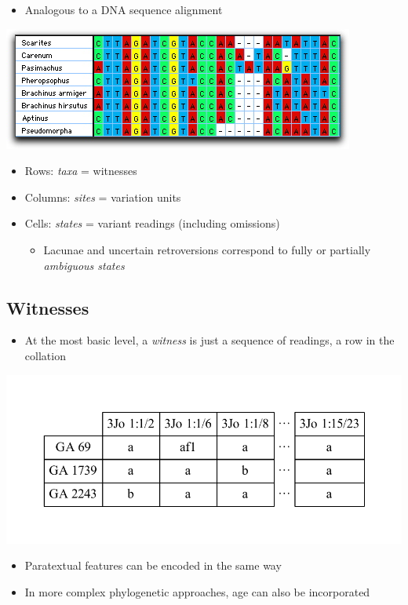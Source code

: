 \documentclass[10pt]{beamer}
\begin{document}
	\begin{frame}
		\begin{itemize}
			\item Analogous to a DNA sequence alignment
		\end{itemize}
		\begin{center}
			\includegraphics[scale=0.5]{../img/sequence-alignment.jpg}
		\end{center}
		\begin{itemize}
			\item Rows: \emph{taxa} = witnesses
			\item Columns: \emph{sites} = variation units
			\item Cells: \emph{states} = variant readings (including omissions)
			\begin{itemize}
				\item Lacunae and uncertain retroversions correspond to fully or partially \emph{ambiguous states}
			\end{itemize}
		\end{itemize}
	\end{frame}
	\subsection{Witnesses}
	\begin{frame}
		\begin{itemize}
			\item At the most basic level, a \emph{witness} is just a sequence of readings, a row in the collation
		\end{itemize}
		\begin{center}
			\includegraphics[scale=0.5]{../img/witnesses.pdf}
		\end{center}
		\begin{itemize}
			\item Paratextual features can be encoded in the same way
			\item In more complex phylogenetic approaches, age can also be incorporated
		\end{itemize}
	\end{frame}
\end{document}
